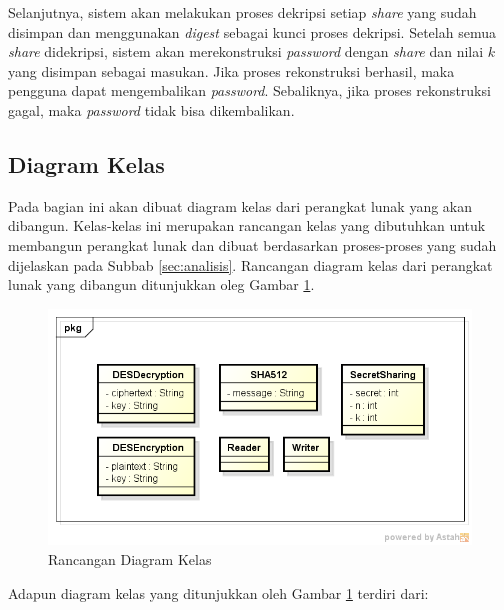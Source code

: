 Selanjutnya, sistem akan melakukan proses dekripsi setiap \textit{share} yang sudah disimpan dan menggunakan \textit{digest} sebagai kunci proses dekripsi. Setelah semua \textit{share} didekripsi, sistem akan merekonstruksi \textit{password} dengan \textit{share} dan nilai $k$ yang disimpan sebagai masukan. Jika proses rekonstruksi berhasil, maka pengguna dapat mengembalikan \textit{password}. Sebaliknya, jika proses rekonstruksi gagal, maka \textit{password} tidak bisa dikembalikan.

\subsection{Diagram Kelas}

Pada bagian ini akan dibuat diagram kelas dari perangkat lunak yang akan dibangun. Kelas-kelas ini merupakan rancangan kelas yang dibutuhkan untuk membangun perangkat lunak dan dibuat berdasarkan proses-proses yang sudah dijelaskan pada Subbab \ref{sec:analisis}. Rancangan diagram kelas dari perangkat lunak yang dibangun ditunjukkan oleg Gambar \ref{fig:diagramkelasdummy}.

\begin{figure}[H]
	\centerline{\includegraphics[scale=0.6]{Gambar/engine-class-diagram}}
	\caption{Rancangan Diagram Kelas}\label{fig:diagramkelasdummy}
\end{figure}

Adapun diagram kelas yang ditunjukkan oleh Gambar \ref{fig:diagramkelasdummy} terdiri dari:

